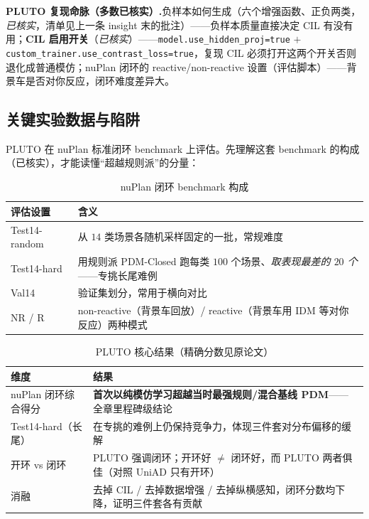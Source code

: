 \begin{note}
\textbf{PLUTO 复现命脉（多数已核实）.}\;负样本如何生成（六个增强函数、正负两类，\emph{已核实}，清单见上一条 insight 末的批注）——负样本质量直接决定 CIL 有没有用；\textbf{CIL 启用开关}（\emph{已核实}）——\texttt{model.\allowbreak use\_hidden\_proj=true} $+$ \texttt{custom\_trainer.\allowbreak use\_contrast\_loss=true}，复现 CIL 必须打开这两个开关否则退化成普通模仿；nuPlan 闭环的 reactive/non-reactive 设置（评估脚本）——背景车是否对你反应，闭环难度差异大。
\end{note}

\subsection{关键实验数据与陷阱}
\label{sec:de-pluto-exp}

PLUTO 在 nuPlan 标准闭环 benchmark 上评估。先理解这套 benchmark 的构成（已核实），才能读懂“超越规则派”的分量：

\begin{table}[H]\centering\small
\caption{nuPlan 闭环 benchmark 构成}
\label{tab:de-nuplan-bench}
\begin{tabular}{p{} p{}}
\toprule
评估设置 & 含义 \\
\midrule
Test14-random & 从 $14$ 类场景各随机采样固定的一批，常规难度 \\
Test14-hard & 用规则派 PDM-Closed 跑每类 $100$ 个场景、\emph{取表现最差的 $20$ 个}——专挑长尾难例 \\
Val14 & 验证集划分，常用于横向对比 \\
NR / R & non-reactive（背景车回放）/ reactive（背景车用 IDM 等对你反应）两种模式 \\
\bottomrule
\end{tabular}
\end{table}

\begin{table}[H]\centering\small
\caption{PLUTO 核心结果（精确分数见原论文）}
\label{tab:de-pluto-metrics}
\begin{tabular}{p{} p{}}
\toprule
维度 & 结果 \\
\midrule
nuPlan 闭环综合得分 & \textbf{首次以纯模仿学习超越当时最强规则/混合基线 PDM}——全章里程碑级结论 \\
Test14-hard（长尾） & 在专挑的难例上仍保持竞争力，体现三件套对分布偏移的缓解 \\
开环 vs 闭环 & PLUTO 强调闭环；开环好 $\neq$ 闭环好，而 PLUTO 两者俱佳（对照 UniAD 只有开环） \\
消融 & 去掉 CIL / 去掉数据增强 / 去掉纵横感知，闭环分数均下降，证明三件套各有贡献 \\
\bottomrule
\end{tabular}
\end{table}

